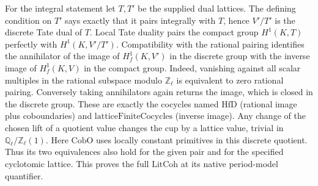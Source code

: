 For the integral statement let $T,T'$ be the supplied dual
lattices. The defining condition on $T'$ says exactly that it
pairs integrally with $T$, hence $V'/T'$ is the discrete Tate
dual of $T$. Local Tate duality pairs the compact group
$H^1(K,T)$ perfectly with $H^1(K,V'/T')$. Compatibility with
the rational pairing identifies the annihilator of the image of
$H_f^1(K,V')$ in the discrete group with the inverse image of
$H_f^1(K,V)$ in the compact group. Indeed, vanishing against
all scalar multiples in the rational subspace modulo
$\mathbb Z_\ell$ is equivalent to zero rational pairing.
Conversely taking annihilators again returns the image, which
is closed in the discrete group. These are exactly the cocycles
named $\mathrm{HfD}$ (rational image plus coboundaries) and
$\mathrm{latticeFiniteCocycles}$ (inverse image). Any change of
the chosen lift of a quotient value changes the cup by a lattice
value, trivial in $\mathbb Q_\ell/\mathbb Z_\ell(1)$.
Here $\mathrm{CobO}$ uses locally constant primitives in this
discrete quotient. Thus its two equivalences also hold for the
given pair and for the specified cyclotomic lattice. This proves
the full $\mathrm{LitCoh}$ at its native period-model quantifier.
